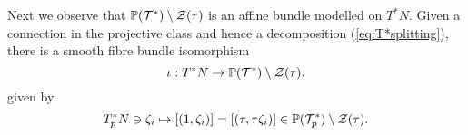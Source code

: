 \begin{rmk}
Next we observe that $\mathbb{P}(\mathcal{T}^*)\setminus \mathcal{Z}(\tau)$ is an affine bundle modelled on $T^* N$. Given a connection in the projective class and hence a decomposition (\ref{eq:T*splitting}), there is a smooth fibre bundle isomorphism
  \begin{equation}\label{key-id}
\iota : T^* N\to \mathbb{P}(\mathcal{T}^*)\setminus \mathcal{Z}(\tau).
    \end{equation}
%
given by
\begin{equation} \label{eq:T*N_is_M}
T_p^*N\ni \zeta_i  \mapsto [(1,\zeta_i)]=[(\tau,\tau \zeta_i)]\in
\mathbb{P}(\mathcal{T}_p^*)\setminus \mathcal{Z}(\tau) .
\end{equation}
\end{rmk}



